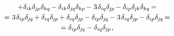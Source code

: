 \begin{otherlanguage}{russian}
\begin{equation*}
\begin{array}{c}
+ \delta_{ik} \delta_{\hspace{-0.1ex}j\hspace{-0.1ex}p} \delta_{kq} \hspace{-0.2ex}
- \delta_{ik} \delta_{\hspace{-0.1ex}j\hspace{-0.1ex}q} \delta_{kp} \hspace{-0.2ex}
- \hspace{.1ex} 3 \hspace{.2ex} \delta_{iq} \delta_{\hspace{-0.1ex}j\hspace{-0.1ex}p} \hspace{-0.2ex}
- \delta_{ip} \delta_{\hspace{-0.1ex}j\hspace{-0.1ex}k} \delta_{kq} \hspace{-0.2ex} =
\\[.25em]
%
= \hspace{.1ex} 3 \hspace{.2ex} \delta_{ip} \delta_{\hspace{-0.1ex}j\hspace{-0.1ex}q} \hspace{-0.2ex}
+ \delta_{iq} \delta_{\hspace{-0.1ex}j\hspace{-0.1ex}p} \hspace{-0.2ex}
+ \delta_{iq} \delta_{\hspace{-0.1ex}j\hspace{-0.1ex}p} \hspace{-0.2ex}
- \delta_{ip} \delta_{\hspace{-0.1ex}j\hspace{-0.1ex}q} \hspace{-0.2ex}
- \hspace{.1ex} 3 \hspace{.2ex} \delta_{iq} \delta_{\hspace{-0.1ex}j\hspace{-0.1ex}p} \hspace{-0.2ex}
- \delta_{ip} \delta_{\hspace{-0.1ex}j\hspace{-0.1ex}q} \hspace{-0.2ex} =
\\[.25em]
%
= \delta_{ip} \delta_{\hspace{-0.1ex}j\hspace{-0.1ex}q} \hspace{-0.1ex}
- \hspace{.1ex} \delta_{iq} \delta_{\hspace{-0.1ex}j\hspace{-0.1ex}p}
\hspace{.2ex} ,
\end{array}\end{equation*}


\end{otherlanguage}
